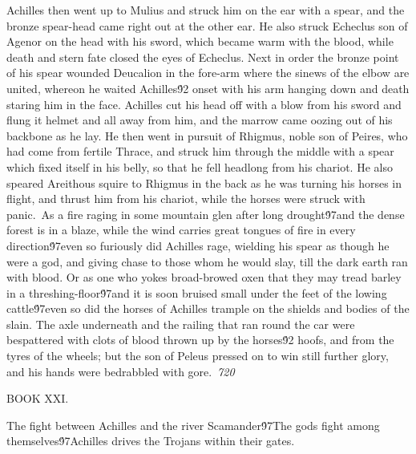 {Achilles then went up to Mulius and struck him on the ear with a spear, and the bronze spear-head came right out at the other ear. He also struck Echeclus son of Agenor on the head with his sword, which became warm with the blood, while death and stern fate closed the eyes of Echeclus. Next in order the bronze point of his spear wounded Deucalion in the fore-arm where the sinews of the elbow are united, whereon he waited Achilles\'92 onset with his arm hanging down and death staring him in the face. Achilles cut his head off with a blow from his sword and flung it helmet and all away from him, and the marrow came oozing out of his backbone as he lay. He then went in pursuit of Rhigmus, noble son of Peires, who had come from fertile Thrace, and struck him through the middle with a spear which fixed itself in his belly, so that he fell headlong from his chariot. He also speared Areithous squire to Rhigmus in the back as he was turning his horses in flight, and thrust him from his chariot, while the horses were struck with panic.\
As a fire raging in some mountain glen after long drought\'97and the dense forest is in a blaze, while the wind carries great tongues of fire in every direction\'97even so furiously did Achilles rage, wielding his spear as though he were a god, and giving chase to those whom he would slay, till the dark earth ran with blood. Or as one who yokes broad-browed oxen that they may tread barley in a threshing-floor\'97and it is soon bruised small under the feet of the lowing cattle\'97even so did the horses of Achilles trample on the shields and bodies of the slain. The axle underneath and the railing that ran round the car were bespattered with clots of blood thrown up by the horses\'92 hoofs, and from the tyres of the wheels; but the son of Peleus pressed on to win still further glory, and his hands were bedrabbled with gore.\
\pard{}\sl720\qc{}

  BOOK XXI.\
\pard\pardeftab720\qj{}

\fs25\fsmilli12800  The fight between Achilles and the river Scamander\'97The gods fight among themselves\'97Achilles drives the Trojans within their gates.\
\pard{}\qj{}

}
